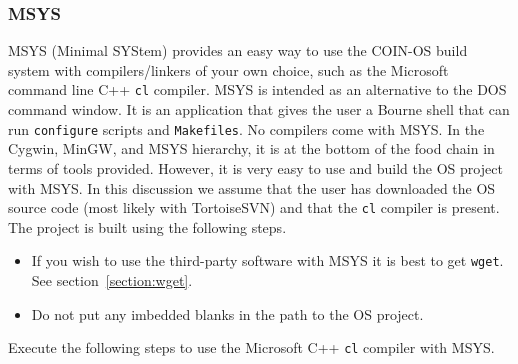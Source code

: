 \documentclass[11pt]{article}
\renewcommand{\_}{{\char"5F}}
\renewcommand{\{}{{\char"7B}}
\renewcommand{\}}{{\char"7D}}
\renewcommand{\^}{{\char"0D}}
\renewcommand{\'}{{\char"0D}}
\begin{document}
\subsubsection{MSYS} \label{section:msys}

%
MSYS (Minimal SYStem) provides an easy way to use the COIN-OS build system with compilers/linkers of your own choice,
such as the Microsoft command line C++ {\tt cl} compiler.  MSYS is intended as an alternative to the DOS command window.
It is an application that gives the user a Bourne shell that can run {\tt configure}  scripts and {\tt Makefiles}.
No compilers come with MSYS.
In the Cygwin, MinGW, and MSYS hierarchy, it is at the bottom of the food chain in terms of tools provided.
However, it is very easy to use and build the OS project with MSYS.    In this discussion we assume that the user
has downloaded the OS source code (most likely  with TortoiseSVN) 
and that the {\tt cl} compiler is present.
The project is built using the following steps.

\vskip 8pt


\begin{itemize}

\item If you wish to use the third-party software with MSYS it is best to get {\tt wget}.
See section~\ref{section:wget}.

 \item Do not put any imbedded blanks in the path to the OS project.
\end{itemize}



Execute the following steps to use the Microsoft C++ {\tt cl} compiler with MSYS.
\end{document}
